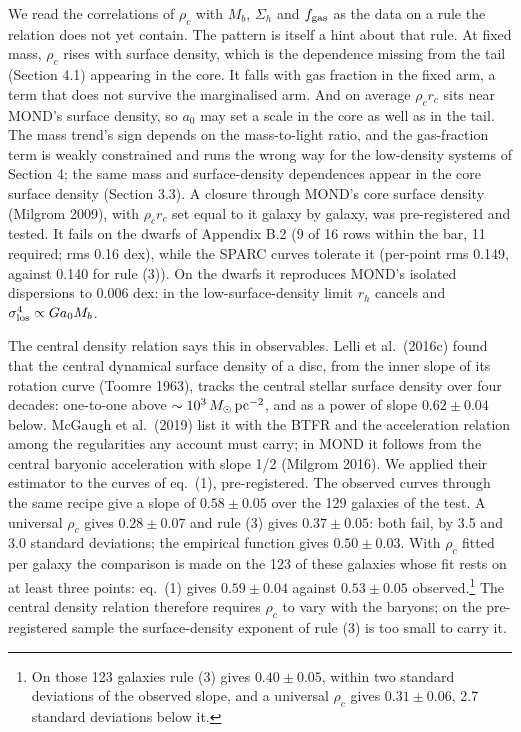\documentclass[
  10pt,
]{article}
\begin{document}
We read the correlations of $\rho_c$ with $M_b$, $\Sigma_h$ and $f_{\rm gas}$ as the data on a rule the relation does not yet contain. The pattern is itself a hint about that rule. At fixed mass, $\rho_c$ rises with surface density, which is the dependence missing from the tail (Section 4.1) appearing in the core. It falls with gas fraction in the fixed arm, a term that does not survive the marginalised arm. And on average $\rho_c r_c$ sits near MOND's surface density, so $a_0$ may set a scale in the core as well as in the tail. The mass trend's sign depends on the mass-to-light ratio, and the gas-fraction term is weakly constrained and runs the wrong way for the low-density systems of Section 4; the same mass and surface-density dependences appear in the core surface density (Section 3.3). A closure through MOND's core surface density (Milgrom 2009), with $\rho_c r_c$ set equal to it galaxy by galaxy, was pre-registered and tested. It fails on the dwarfs of Appendix B.2 (9 of 16 rows within the bar, 11 required; rms 0.16 dex), while the SPARC curves tolerate it (per-point rms 0.149, against 0.140 for rule (3)). On the dwarfs it reproduces MOND's isolated dispersions to 0.006 dex: in the low-surface-density limit $r_h$ cancels and $\sigma_{\rm los}^4 \propto G a_0 M_b$.

The central density relation says this in observables. Lelli et al.~(2016c) found that the central dynamical surface density of a disc, from the inner slope of its rotation curve (Toomre 1963), tracks the central stellar surface density over four decades: one-to-one above $\sim10^3\,M_\odot\,{\rm pc}^{-2}$, and as a power of slope $0.62\pm0.04$ below. McGaugh et al.~(2019) list it with the BTFR and the acceleration relation among the regularities any account must carry; in MOND it follows from the central baryonic acceleration with slope 1/2 (Milgrom 2016). We applied their estimator to the curves of eq.~(1), pre-registered. The observed curves through the same recipe give a slope of $0.58\pm0.05$ over the 129 galaxies of the test. A universal $\rho_c$ gives $0.28\pm0.07$ and rule (3) gives $0.37\pm0.05$: both fail, by 3.5 and 3.0 standard deviations; the empirical function gives $0.50\pm0.03$. With $\rho_c$ fitted per galaxy the comparison is made on the 123 of these galaxies whose fit rests on at least three points: eq.~(1) gives $0.59\pm0.04$ against $0.53\pm0.05$ observed.\footnote{On those 123 galaxies rule (3) gives $0.40\pm0.05$, within two standard deviations of the observed slope, and a universal $\rho_c$ gives $0.31\pm0.06$, 2.7 standard deviations below it.} The central density relation therefore requires $\rho_c$ to vary with the baryons; on the pre-registered sample the surface-density exponent of rule (3) is too small to carry it.
\end{document}
